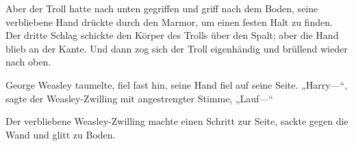 Aber der Troll hatte nach unten gegriffen und griff nach dem Boden, seine verbliebene Hand drückte durch den Marmor, um einen festen Halt zu finden. Der dritte Schlag schickte den Körper des Trolls über den Spalt; aber die Hand blieb an der Kante. Und dann zog sich der Troll eigenhändig und brüllend wieder nach oben.

George Weasley taumelte, fiel fast hin, seine Hand fiel auf seine Seite. „Harry—“, sagte der Weasley-Zwilling mit angestrengter Stimme, „Lauf—“

Der verbliebene Weasley-Zwilling machte einen Schritt zur Seite, sackte gegen die Wand und glitt zu Boden.

